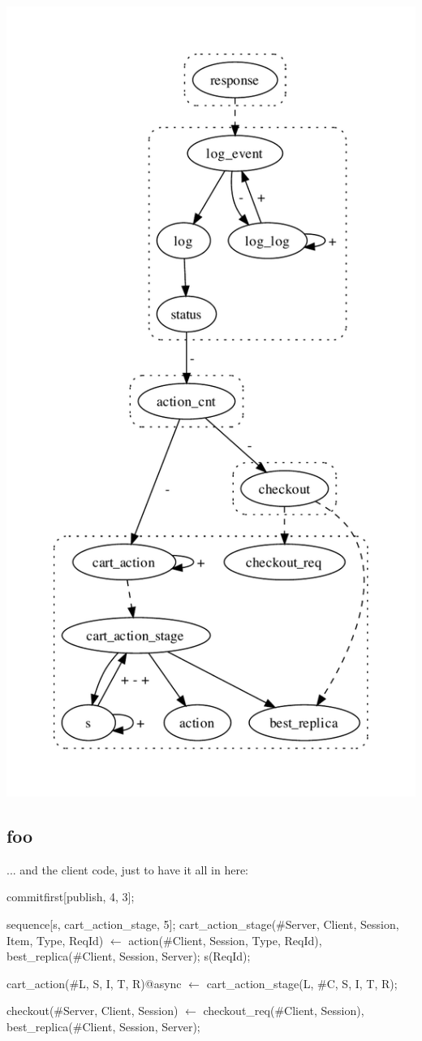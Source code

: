 \includegraphics[width=0.65\linewidth]{vizza_withatmostonce.pdf}


\subsection{foo}

... and the client code, just to have it all in here:

\begin{Dedalus}
commitfirst[publish, 4, 3];

sequence[s, cart_action_stage, 5];
cart_action_stage(#Server, Client, Session, Item, Type, ReqId) \(\leftarrow\)
    action(#Client, Session, Type, ReqId),
    best_replica(#Client, Session, Server);
    s(ReqId);

cart_action(#L, S, I, T, R)@async \(\leftarrow\) 
    cart_action_stage(L, #C, S, I, T, R);

checkout(#Server, Client, Session) \(\leftarrow\)
    checkout_req(#Client, Session),
    best_replica(#Client, Session, Server);
\end{Dedalus}
